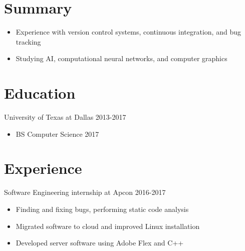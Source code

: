 \documentclass[line,margin]{res}
\begin{document}
	\address{(512)574-6609 |
	\href{mailto:blakerandall0@gmail.com}{blakerandall0@gmail.com}}

\begin{resume}

\vspace{8pt}
\section{Summary}
\vspace{22pt}
	\begin{itemize} \itemsep -2pt
	\item Experience with version control systems, continuous integration, and bug tracking
	\item Studying AI, computational neural networks, and computer graphics
	\end{itemize}

\vspace{-4pt}
\section{Education}
\vspace{12pt}
University of Texas at Dallas \hfill 2013-2017 \\
\vspace{-12pt}
	\begin{itemize} \itemsep -2pt
	\item BS Computer Science 2017
	\end{itemize}

\vspace{-4pt}
\section{Experience}
\vspace{12pt}
Software Engineering internship at Apcon
\hfill 2016-2017
	\begin{itemize} \itemsep -2pt
	\item Finding and fixing bugs, performing static code analysis
	\item Migrated software to cloud and improved Linux installation
	\item Developed server software using Adobe Flex and C++
	\end{itemize}

\vspace{-4pt}

\end{resume}
\end{document}
